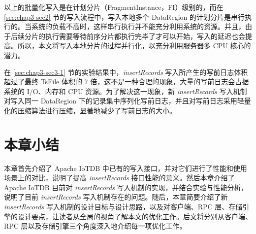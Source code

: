 以上的批量化写入是在计划分片（FragmentInstance，FI）级别的，而在 \ref{sec:chap3-sec2} 节的写入流程中，写入本地多个 DataRegion 的计划分片是串行执行的。当系统的负载不高时，这样串行执行并不能充分利用系统的资源。并且，由于后续分片的执行需要等待前序分片都执行完毕了才可以开始，写入的延迟也会提高。所以，本文将写入本地分片的过程并行化，以充分利用服务器多 CPU 核心的潜力。

在 \ref{sec:chap3-sec3-1} 节的实验结果中，\emph{insertRecords} 写入所产生的写前日志体积超过了最终 TsFile 体积的 7 倍，这不是一种合理的现象，大量的写前日志会占据系统的 I/O、内存和 CPU 资源。为了解决这一现象，新 \emph{insertRecords} 写入机制对写入同一 DataRegion 下的记录集中序列化写前日志，并且对写前日志采用轻量化的压缩算法进行压缩，显著地减少了写前日志的大小。


\section{本章小结}
本章首先介绍了 Apache IoTDB 中已有的写入接口，并对它们进行了性能和使用场景上的对比，说明了提高 \emph{insertRecords} 接口性能的意义。然后本章介绍了 Apache IoTDB 目前对 \emph{insertRecords} 写入机制的实现，并结合实验与性能分析，说明了目前 \emph{insertRecords} 写入机制存在的问题。随后，本章简要介绍了新 \emph{insertRecords} 写入机制的设计目标与设计思路，以及对客户端、RPC 层、存储引擎的设计要点，让读者从全局的视角了解本文的优化工作。后文将分别从客户端、RPC 层以及存储引擎三个角度深入地介绍每一项优化工作。

